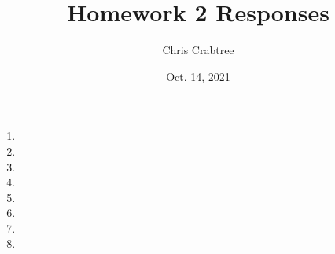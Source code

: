 \documentclass[12pt]{article}
\begin{document}
\title{Homework 2 Responses}
\author{Chris Crabtree}
\date{Oct. 14, 2021}

{
\let\clearpage\relax
\maketitle
}

\begin{enumerate}
    \item
        
    \item 
        
    \item
        
    \item
        
    \item
        
    \item
        
    \item
        
    \item
        

\end{enumerate}
\end{document}
